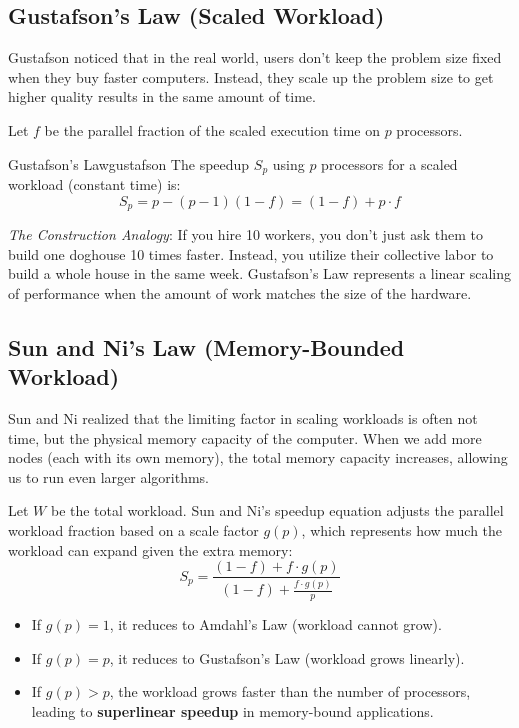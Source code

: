 \documentclass[11pt,a4paper]{article}
\begin{document}
\subsection{Gustafson's Law (Scaled Workload)}
Gustafson noticed that in the real world, users don't keep the problem size fixed when they buy faster computers. Instead, they scale up the problem size to get higher quality results in the same amount of time. 

Let $f$ be the parallel fraction of the scaled execution time on $p$ processors.

\begin{theorem}{Gustafson's Law}{gustafson}
The speedup $S_p$ using $p$ processors for a scaled workload (constant time) is:
\begin{equation}
    S_p = p - (p - 1)(1 - f) = (1 - f) + p \cdot f
\end{equation}
\end{theorem}

\begin{notebox}
\textit{The Construction Analogy}:
If you hire 10 workers, you don't just ask them to build one doghouse 10 times faster. Instead, you utilize their collective labor to build a whole house in the same week. Gustafson's Law represents a linear scaling of performance when the amount of work matches the size of the hardware.
\end{notebox}

\subsection{Sun and Ni's Law (Memory-Bounded Workload)}
Sun and Ni realized that the limiting factor in scaling workloads is often not time, but the physical memory capacity of the computer. When we add more nodes (each with its own memory), the total memory capacity increases, allowing us to run even larger algorithms. 

Let $W$ be the total workload. Sun and Ni's speedup equation adjusts the parallel workload fraction based on a scale factor $g(p)$, which represents how much the workload can expand given the extra memory:
\begin{equation}
    S_p = \frac{(1-f) + f \cdot g(p)}{(1-f) + \frac{f \cdot g(p)}{p}}
\end{equation}
\begin{itemize}
    \item If $g(p) = 1$, it reduces to Amdahl's Law (workload cannot grow).
    \item If $g(p) = p$, it reduces to Gustafson's Law (workload grows linearly).
    \item If $g(p) > p$, the workload grows faster than the number of processors, leading to \textbf{superlinear speedup} in memory-bound applications.
\end{itemize}
\end{document}
